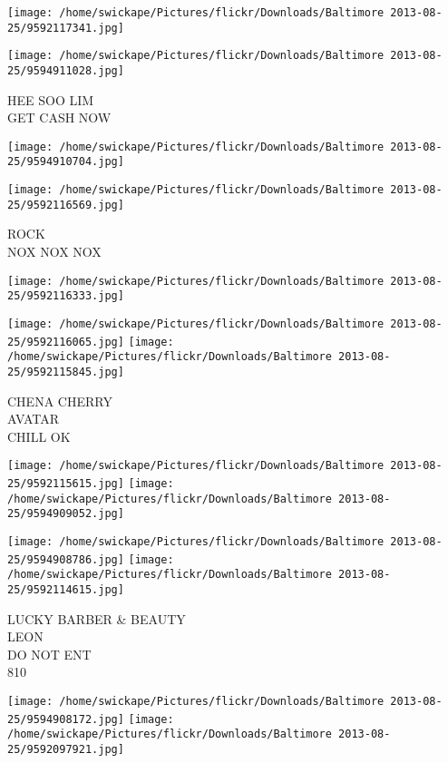\documentclass[10pt,letterpaper]{article}
\begin{document}
\texttt{[image: /home/swickape/Pictures/flickr/Downloads/Baltimore 2013-08-25/9592117341.jpg]}

\vspace{0.25in}
\texttt{[image: /home/swickape/Pictures/flickr/Downloads/Baltimore 2013-08-25/9594911028.jpg]}

HEE SOO LIM\\
GET CASH NOW\\
\pagebreak

\texttt{[image: /home/swickape/Pictures/flickr/Downloads/Baltimore 2013-08-25/9594910704.jpg]}

\vspace{0.25in}
\texttt{[image: /home/swickape/Pictures/flickr/Downloads/Baltimore 2013-08-25/9592116569.jpg]}

ROCK\\
NOX NOX NOX\\
\pagebreak

\texttt{[image: /home/swickape/Pictures/flickr/Downloads/Baltimore 2013-08-25/9592116333.jpg]}

\vspace{0.25in}
\texttt{[image: /home/swickape/Pictures/flickr/Downloads/Baltimore 2013-08-25/9592116065.jpg]}
\texttt{[image: /home/swickape/Pictures/flickr/Downloads/Baltimore 2013-08-25/9592115845.jpg]}

CHENA CHERRY\\
AVATAR\\
CHILL OK\\
\pagebreak

\texttt{[image: /home/swickape/Pictures/flickr/Downloads/Baltimore 2013-08-25/9592115615.jpg]}
\texttt{[image: /home/swickape/Pictures/flickr/Downloads/Baltimore 2013-08-25/9594909052.jpg]}

\texttt{[image: /home/swickape/Pictures/flickr/Downloads/Baltimore 2013-08-25/9594908786.jpg]}
\texttt{[image: /home/swickape/Pictures/flickr/Downloads/Baltimore 2013-08-25/9592114615.jpg]}

LUCKY BARBER \& BEAUTY\\
LEON\\
DO NOT ENT\\
810\\
\pagebreak

\texttt{[image: /home/swickape/Pictures/flickr/Downloads/Baltimore 2013-08-25/9594908172.jpg]}
\texttt{[image: /home/swickape/Pictures/flickr/Downloads/Baltimore 2013-08-25/9592097921.jpg]}
\end{document}
